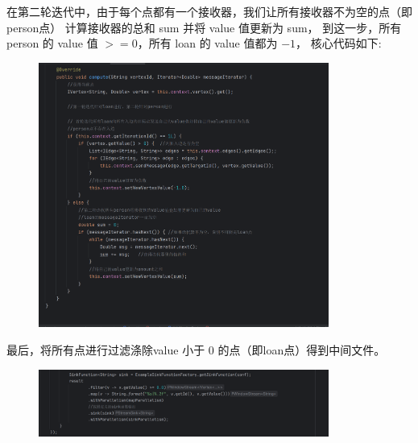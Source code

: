 在第二轮迭代中，由于每个点都有一个接收器，我们让所有接收器不为空的点（即person点）
计算接收器的总和 sum 并将 value 值更新为 sum，
到这一步，所有 person 的 value 值 $ >=0 $，所有 loan 的 value 值都为 $ -1 $，
核心代码如下:
\begin{figure}[H]
  \begin{center}
    \includegraphics[width=0.85\textwidth,scale=0.7]{./figures/pro3/2.png}
  \end{center}
\end{figure}

最后，将所有点进行过滤涤除value 小于 $ 0 $ 的点（即loan点）得到中间文件。
\begin{figure}[H]
  \begin{center}
    \includegraphics[width=0.85\textwidth,scale=0.7]{./figures/pro3/3.png}
  \end{center}
\end{figure}

